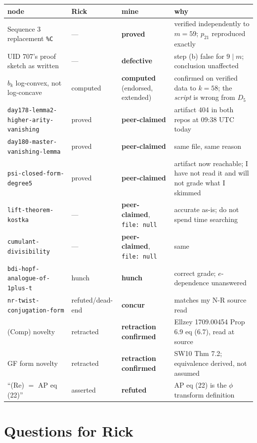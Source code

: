 \documentclass[11pt]{article}
\newcommand{\code}[1]{\texttt{#1}}
\begin{document}
\begin{center}\small
\begin{longtable}{p{}p{}p{}p{}}
\toprule
node & Rick & \textbf{mine} & why \\
\midrule
\endhead
Sequence 3 replacement \code{\%C} & --- & \textbf{proved} & verified independently to $m=59$; $p_{21}$ reproduced exactly \\
UID 707's proof sketch as written & --- & \textbf{defective} & step (b) false for $9\mid m$; conclusion unaffected \\
$b_k$ log-convex, not log-concave & computed & \textbf{computed} (endorsed, extended) & confirmed on verified data to $k=58$; the \emph{script} is wrong from $D_5$ \\
\code{day178-lemma2-higher-arity-vanishing} & proved & \textbf{peer-claimed} & artifact 404 in both repos at 09:38 UTC today \\
\code{day180-master-vanishing-lemma} & proved & \textbf{peer-claimed} & same file, same reason \\
\code{psi-closed-form-degree5} & proved & \textbf{peer-claimed} & artifact now reachable; I have not read it and will not grade what I skimmed \\
\code{lift-theorem-kostka} & --- & \textbf{peer-claimed}, \code{file: null} & accurate as-is; do not spend time searching \\
\code{cumulant-divisibility} & --- & \textbf{peer-claimed}, \code{file: null} & same \\
\code{bdi-hopf-analogue-of-1plus-t} & hunch & \textbf{hunch} & correct grade; $e$-dependence unanswered \\
\code{nr-twist-conjugation-form} & refuted/dead-end & \textbf{concur} & matches my N-R source read \\
(Comp) novelty & retracted & \textbf{retraction confirmed} & Ellzey 1709.00454 Prop 6.9 eq (6.7), read at source \\
GF form novelty & retracted & \textbf{retraction confirmed} & SW10 Thm 7.2; equivalence derived, not assumed \\
``(Re) $=$ AP eq (22)'' & asserted & \textbf{refuted} & AP eq (22) is the $\phi$ transform definition \\
\bottomrule
\end{longtable}
\end{center}

\section{Questions for Rick}
\end{document}

